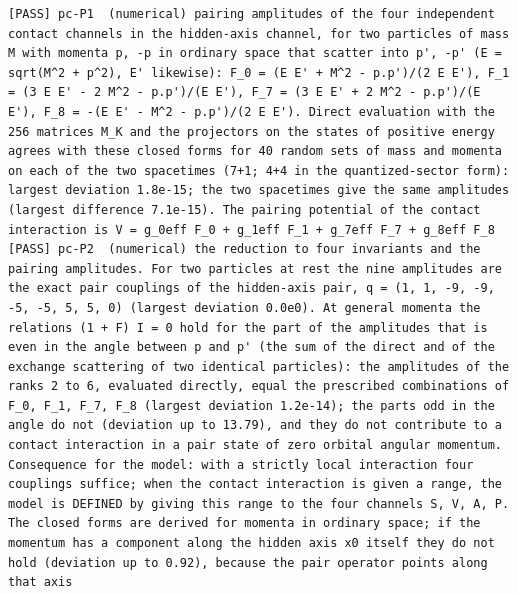 \documentclass[
  10pt,
]{article}
\begin{document}
\begin{verbatim}
[PASS] pc-P1  (numerical) pairing amplitudes of the four independent contact channels in the hidden-axis channel, for two particles of mass M with momenta p, -p in ordinary space that scatter into p', -p' (E = sqrt(M^2 + p^2), E' likewise): F_0 = (E E' + M^2 - p.p')/(2 E E'), F_1 = (3 E E' - 2 M^2 - p.p')/(E E'), F_7 = (3 E E' + 2 M^2 - p.p')/(E E'), F_8 = -(E E' - M^2 - p.p')/(2 E E'). Direct evaluation with the 256 matrices M_K and the projectors on the states of positive energy agrees with these closed forms for 40 random sets of mass and momenta on each of the two spacetimes (7+1; 4+4 in the quantized-sector form): largest deviation 1.8e-15; the two spacetimes give the same amplitudes (largest difference 7.1e-15). The pairing potential of the contact interaction is V = g_0eff F_0 + g_1eff F_1 + g_7eff F_7 + g_8eff F_8
[PASS] pc-P2  (numerical) the reduction to four invariants and the pairing amplitudes. For two particles at rest the nine amplitudes are the exact pair couplings of the hidden-axis pair, q = (1, 1, -9, -9, -5, -5, 5, 5, 0) (largest deviation 0.0e0). At general momenta the relations (1 + F) I = 0 hold for the part of the amplitudes that is even in the angle between p and p' (the sum of the direct and of the exchange scattering of two identical particles): the amplitudes of the ranks 2 to 6, evaluated directly, equal the prescribed combinations of F_0, F_1, F_7, F_8 (largest deviation 1.2e-14); the parts odd in the angle do not (deviation up to 13.79), and they do not contribute to a contact interaction in a pair state of zero orbital angular momentum. Consequence for the model: with a strictly local interaction four couplings suffice; when the contact interaction is given a range, the model is DEFINED by giving this range to the four channels S, V, A, P. The closed forms are derived for momenta in ordinary space; if the momentum has a component along the hidden axis x0 itself they do not hold (deviation up to 0.92), because the pair operator points along that axis

\end{verbatim}
\end{document}
